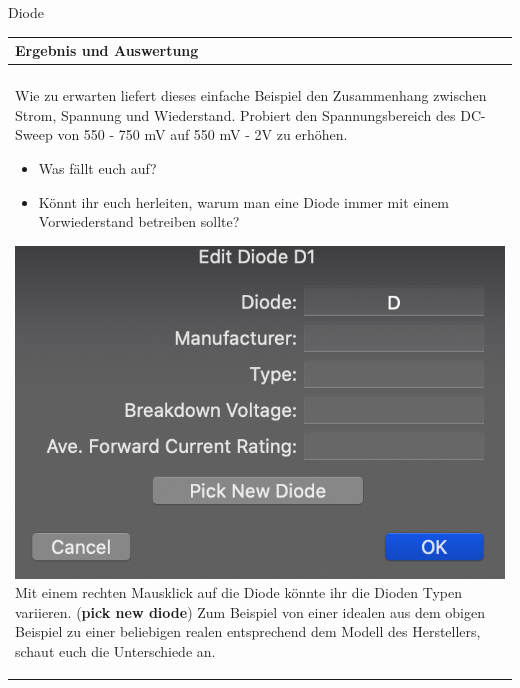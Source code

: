 \begin{frame}[t]{Diode}
      \begin{spacing}{0.9} \begin{tiny}
        \begin{table}[h!]
          \begin{tabular}{p{10cm} }
            \hline
            \textbf{Ergebnis und Auswertung} \\
            \hline \\    
            Wie zu erwarten liefert dieses einfache Beispiel den Zusammenhang zwischen Strom, Spannung und Wiederstand. Probiert den Spannungsbereich des
            DC-Sweep von 550 - 750 mV auf 550 mV - 2V zu erhöhen.          
            \begin{itemize}
              \item Was fällt euch auf?
              \item Könnt ihr euch herleiten, warum man eine 
              Diode immer mit einem Vorwiederstand betreiben sollte? 
            \end{itemize}  
            \includegraphics[scale=0.1]{pictures/diode_choice.png} \newline
            Mit einem rechten Mausklick auf die Diode könnte ihr die Dioden Typen variieren. (\textbf{pick new diode})
            Zum Beispiel von einer idealen aus dem obigen Beispiel zu einer beliebigen realen entsprechend dem Modell des Herstellers, schaut euch die Unterschiede an.
          \end{tabular}
        \end{table}
      \end{tiny} \end{spacing}
      
       \end{frame}